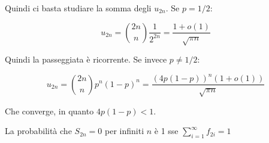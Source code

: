 \documentclass[12pt,a4paper]{article}
\numberwithin{equation}{section}
\theoremstyle{definition}
\theoremstyle{remark}
\begin{document}
Quindi ci basta studiare la somma degli $u_{2n}$. Se $p=1/2$:

\begin{equation}
u_{2n} = {2n \choose n} \frac{1}{2^{2n}} = \frac{1+ o(1)}{\sqrt{\pi n}}
\end{equation}

Quindi la passeggiata è ricorrente. Se invece $p \neq 1/2$:

\begin{equation}
u_{2n} = {2n \choose n} p^{n} (1-p)^{n} = \frac{(4p (1-p))^n (1+o(1))}{\sqrt{\pi n}}
\end{equation}

Che converge, in quanto $4p (1-p)<1$.

La probabilità che $S_{2n} = 0$ per infiniti $n$ è 1 sse $\sum_{i=1}^\infty f_{2i} =1$

\tableofcontents
\end{document}
